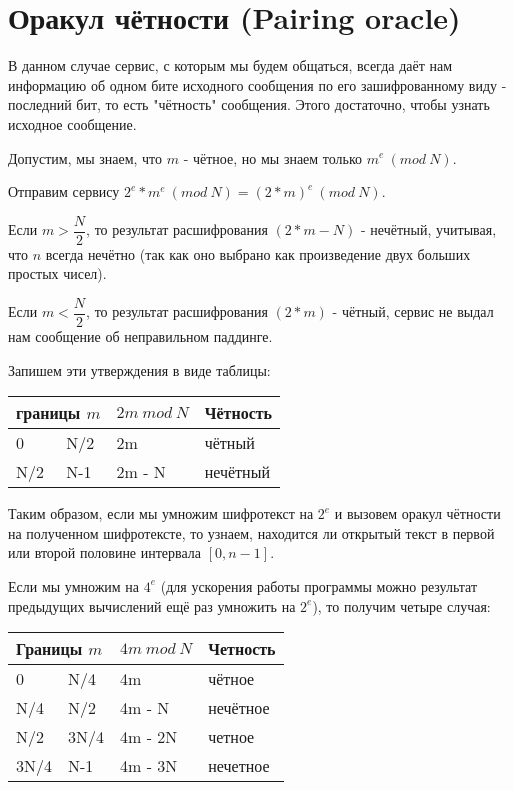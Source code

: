 \documentclass[12pt,a4paper]{scrartcl}
\begin{document}
\section{Оракул чётности (Pairing oracle)}

В данном случае сервис, с которым мы будем общаться, всегда даёт нам информацию об одном бите исходного сообщения по его зашифрованному виду - последний бит, то есть "чётность" сообщения. Этого достаточно, чтобы узнать исходное сообщение.

Допустим, мы знаем, что $m$ - чётное, но мы знаем только $m^e\ (mod\ N)$.

Отправим сервису $2^e*m^e\ (mod\ N)=(2*m)^e\ (mod\ N)$.

Если $m > \dfrac{N}{2}$, то результат расшифрования $(2*m-N)$ - нечётный, учитывая, что $n$ всегда нечётно (так как оно выбрано как произведение двух больших простых чисел). 

Если $m<\dfrac{N}{2}$, то результат расшифрования $(2*m)$ - чётный, сервис не выдал нам сообщение об неправильном паддинге.

Запишем эти утверждения в виде таблицы:

\begin{table}[H]
	\centering
	\begin{tabular}{|l|l|l|l|}
		\hline
		\multicolumn{2}{|l|}{\textbf{границы $m$}} & \textbf{$2m\ mod\ N$} & \textbf{Чётность} \\ \hline
		0                    & N/2                 & 2m                    & чётный            \\ \hline
		N/2                  & N-1                 & 2m - N                & нечётный          \\ \hline
	\end{tabular}
\end{table}

Таким образом, если мы умножим шифротекст на $2^e$ и вызовем оракул чётности на полученном шифротексте, то узнаем, находится ли открытый текст в первой или второй половине интервала $[0, n-1]$. 

Если мы умножим на $4^e$ (для ускорения работы программы можно результат предыдущих вычислений ещё раз умножить на $2^e$), то получим четыре случая:

\begin{table}[H]
	\centering
	\begin{tabular}{|l|l|l|l|}
		\hline
		\multicolumn{2}{|l|}{\textbf{Границы $m $}} & \textbf{$4m\ mod\ N $} & \textbf{Четность} \\ \hline
		0                    & N/4                  & 4m                     & чётное            \\ \hline
		N/4                  & N/2                  & 4m - N                 & нечётное          \\ \hline
		N/2                  & 3N/4                 & 4m - 2N                & четное            \\ \hline
		3N/4                 & N-1                  & 4m - 3N                & нечетное          \\ \hline
	\end{tabular}
\end{table}
\end{document}
